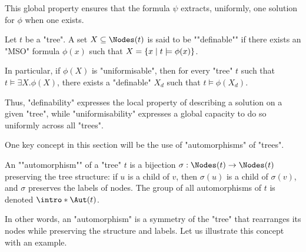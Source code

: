 \documentclass[a4paper,UKenglish,cleveref, autoref, thm-restate]{lipics-v2021}
\begin{document}
This global property ensures that the formula $\psi$ extracts, uniformly, one solution for $\phi$ when one exists.

\begin{definition}\label{def:definable}
	\AP Let $t$ be a "tree". A set $X \subseteq \Nodes(t)$ is said to be ""definable"" if there exists an
	"MSO" formula $\phi(x)$ such that $X = \left\{x \mid t \models \phi(x)\right\}$.
\end{definition}

In particular, if $\phi(X)$ is "uniformisable", then for every "tree" $t$ such that $t \models \exists X. \phi(X)$,
there exists a "definable" $X_d$ such that $t \models \phi(X_d)$.

Thus, "definability" expresses the local property of describing a solution on a given "tree", while "uniformisability" expresses
a global capacity to do so uniformly across all "trees".


One key concept in this section will be the use of "automorphisms" of "trees".

\begin{definition}["Automorphism"]\label{def:automorphism}
	\AP An ""automorphism"" of a "tree" $t$ is a bijection $\sigma : \Nodes(t) \to \Nodes(t)$ preserving the tree structure:
	if $u$ is a child of $v$, then $\sigma(u)$ is a child of $\sigma(v)$, and $\sigma$ preserves the labels of nodes.
	The group of all automorphisms of $t$ is denoted $\intro* \Aut(t)$.
\end{definition}

In other words, an "automorphism" is a symmetry of the "tree" that rearranges its nodes while preserving the structure and labels.
Let us illustrate this concept with an example.
\end{document}
